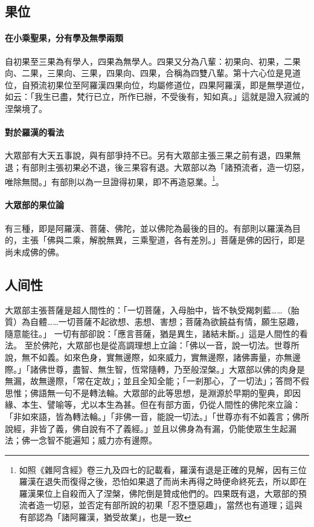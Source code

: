 \subsection{果位}
\paragraph{在小乘聖果，分有學及無學兩類}自初果至三果為有學人，四果為無學人。四果又分為八輩：初果向、初果，二果向、二果，三果向、三果，四果向、四果，合稱為四雙八輩。第十六心位是見道位，自預流初果位至阿羅漢四果向位，均屬修道位，四果阿羅漢，即是無學道位，如云：「我生已盡，梵行已立，所作已辦，不受後有，知如真。」這就是證入寂滅的涅槃境了。
\paragraph{對於羅漢的看法}大眾部有大天五事說，與有部爭持不已。另有大眾部主張三果之前有退，四果無退；有部則主張初果必不退，後三果容有退。大眾部以為「諸預流者，造一切惡，唯除無間。」有部則以為一旦證得初果，即不再造惡業。\footnote{如照《雜阿含經》卷三九及四七的記載看，羅漢有退是正確的見解，因有三位羅漢在退失而復得之後，恐怕如果退了而尚未再得之時便命終死去，所以即在羅漢果位上自殺而入了涅槃，佛陀倒是贊成他們的。四果既有退，大眾部的預流者造一切惡，並否定有部所說的初果「忍不墮惡趣」，當然也有道理；這與有部認為「諸阿羅漢，猶受故業」，也是一致}。
\paragraph{大眾部的果位論}有三種，即是阿羅漢、菩薩、佛陀，並以佛陀為最後的目的。有部則以羅漢為目的，主張「佛與二乘，解脫無異，三乘聖道，各有差別。」菩薩是佛的因行，即是尚未成佛的佛。

\subsection{人间性}
大眾部主張菩薩是超人間性的：「一切菩薩，入母胎中，皆不執受羯刺藍……（胎質）為自體……一切菩薩不起欲想、恚想、害想；菩薩為欲饒益有情，願生惡趣，隨意能往。」
一切有部卻說：「應言菩薩，猶是異生，諸結未斷。」這是人間性的看法。
至於佛陀，大眾部也是從高調理想上立論：「佛以一音，說一切法。世尊所說，無不如義。如來色身，實無邊際，如來威力，實無邊際，諸佛壽量，亦無邊際。」「諸佛世尊，盡智、無生智，恆常隨轉，乃至般涅槃。」大眾部以佛的肉身是無漏，故無邊際，「常在定故」；並且全知全能；「一剎那心，了一切法」；答問不假思惟；佛語無一句不是轉法輪。大眾部的此等思想，是淵源於早期的聖典，即因緣、本生、譬喻等，尤以本生為甚。但在有部方面，仍從人間性的佛陀來立論：「非如來語，皆為轉法輪。」「非佛一音，能說一切法。」「世尊亦有不如義言；佛所說經，非皆了義，佛自說有不了義經。」並且以佛身為有漏，仍能使眾生生起漏法；佛一念智不能遍知；威力亦有邊際。

